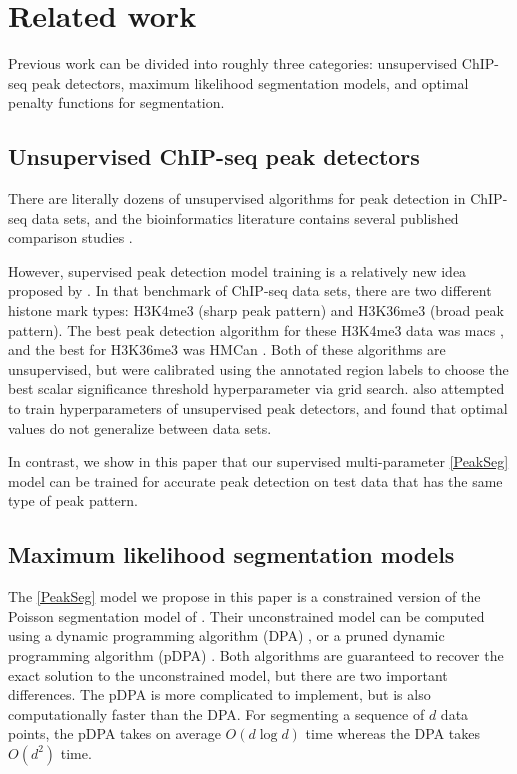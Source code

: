 \documentclass{article}
\begin{document}
\section{Related work}
\label{sec:related}

Previous work can be divided into roughly three categories:
unsupervised ChIP-seq peak detectors, maximum likelihood segmentation
models, and optimal penalty functions for segmentation.

\subsection{Unsupervised ChIP-seq peak detectors}

There are literally dozens of unsupervised algorithms for peak
detection in ChIP-seq data sets, and the bioinformatics literature
contains several published comparison studies \citep{evaluation2010,
  rye2010manually, chip-seq-bench}. 

However, supervised peak detection model training is a relatively new
idea proposed by \citet{hocking2014visual}. In that benchmark of
ChIP-seq data sets, there are two different histone mark types:
H3K4me3 (sharp peak pattern) and H3K36me3 (broad peak pattern). The
best peak detection algorithm for these H3K4me3 data was macs
\citep{MACS}, and the best for H3K36me3 was HMCan \citep{HMCan}. Both
of these algorithms are unsupervised, but were calibrated using the
annotated region labels to choose the best scalar significance
threshold hyperparameter via grid search. \citet{picking2012} also
attempted to train hyperparameters of unsupervised peak detectors, and
found that optimal values do not generalize between data sets. 

In contrast, we show in this paper that our supervised multi-parameter
\ref{PeakSeg} model can be trained for accurate peak detection on test
data that has the same type of peak pattern.

\subsection{Maximum likelihood segmentation models}

The \ref{PeakSeg} model we propose in this paper is a constrained
version of the Poisson segmentation model of \citet{Segmentor}.
Their unconstrained model can be computed using a dynamic programming
algorithm (DPA) \citep{bellman}, or a pruned dynamic programming
algorithm (pDPA) \citep{pruned-dp}. Both algorithms are guaranteed to
recover the exact solution to the unconstrained model, but there are
two important differences. The pDPA is more complicated to implement,
but is also computationally faster than the DPA. For segmenting a
sequence of $d$ data points, the pDPA takes on average $O(d\log d)$
time whereas the DPA takes $O(d^2)$ time. 
\end{document}
